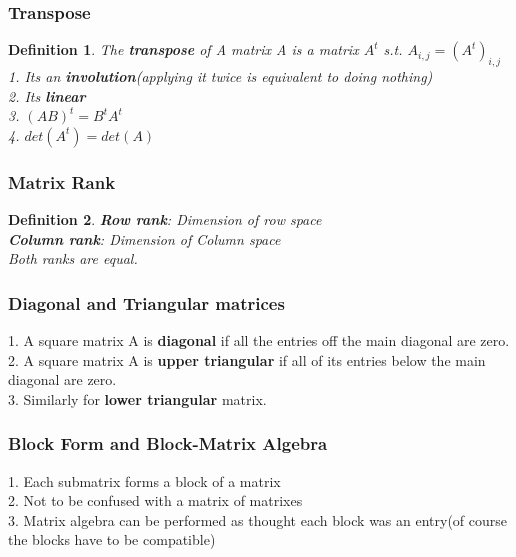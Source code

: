 \documentclass [12pt]{article}
\newtheorem {definition}{Definition}
\begin{document}
\subsubsection {Transpose} 
\begin {definition}
 The \textbf{transpose} of A matrix A is a matrix $A^t$ s.t. $A_{i,j}=(A^{t})_{i,j}$\\

1. Its an \textbf{involution}(applying it twice is equivalent to doing nothing)\\
2. Its \textbf{linear}\\
3. $(AB)^t=B^tA^t$\\
4. $det(A^t)=det(A)$ 
\end {definition}


\subsubsection {Matrix Rank} 

\begin {definition}
 \textbf{Row rank}: Dimension of row space\\
\textbf{Column rank}: Dimension of Column space\\

Both ranks are equal. 
\end {definition}
 


\subsubsection {Diagonal and Triangular matrices} 1. A square matrix A is
\textbf{diagonal} if all the entries off the main diagonal are zero.\\
2. A square matrix A is \textbf{upper triangular} if all of its entries
below the main diagonal are zero.\\
3. Similarly for \textbf{lower triangular} matrix.\\


\subsubsection {Block Form and Block-Matrix Algebra} 

1. Each submatrix forms a block of a matrix\\
2. Not to be confused with a matrix of matrixes\\
3. Matrix algebra can be performed as thought each block was an entry(of
course the blocks have to be compatible)\\
\end{document}
